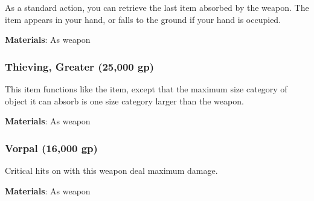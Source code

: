 As a standard action, you can retrieve the last item absorbed by the weapon.
The item appears in your hand, or falls to the ground if your hand is occupied.



\vspace{0.25em}
\textbf{Materials}: As weapon


\lowercase{\hypertarget{item:Thieving, Greater}{}}\label{item:Thieving, Greater}
\hypertarget{item:Thieving, Greater}{\subsubsection{Thieving, Greater\hfill{} (25,000 gp)}}

This item functions like the  item, except that the maximum size category of object it can absorb is one size category larger than the weapon.



\vspace{0.25em}
\textbf{Materials}: As weapon


\lowercase{\hypertarget{item:Vorpal}{}}\label{item:Vorpal}
\hypertarget{item:Vorpal}{\subsubsection{Vorpal\hfill{} (16,000 gp)}}

Critical hits on  with this weapon deal maximum damage.



\vspace{0.25em}
\textbf{Materials}: As weapon
